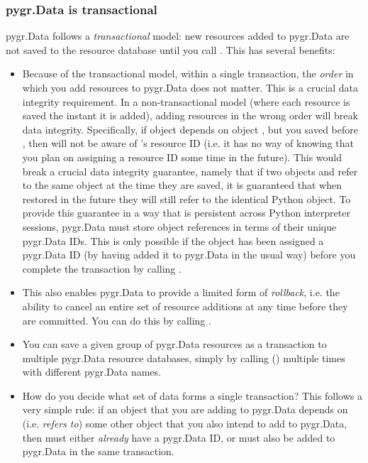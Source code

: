 \documentclass{howto}
\begin{document}
\subsubsection{pygr.Data is transactional}

pygr.Data follows a {\em transactional} model: new resources
added to pygr.Data are not saved to the resource database until you
call .  This has several benefits:

\begin{itemize}
\item Because of the transactional model,
within a single transaction, the {\em order} in which you
add resources to pygr.Data does not matter.  This is a crucial data
integrity requirement.  In a non-transactional model (where each
resource is saved the instant it is added), adding resources in the
wrong order will break data integrity.  Specifically, 
if object  depends on object , 
but you saved  before , then
 will not be aware of 's resource ID (i.e. it has no way of
knowing that you plan on assigning  a resource ID some time
in the future).  This would break a crucial data integrity guarantee,
namely that if two objects  and  refer to the same
object  at the time they are saved, it is guaranteed that
when restored in the future they will still refer to the identical
Python object.  To provide this guarantee in a way that is
persistent across Python interpreter sessions, pygr.Data must 
store object references in terms of their unique pygr.Data IDs.
This is only possible if the object has been assigned a pygr.Data
ID (by having added it to pygr.Data in the usual way) before
you complete the transaction by calling .

\item This also enables pygr.Data to provide a limited form of
{\em rollback}, i.e. the ability to cancel an entire set of
resource additions at any time before they are committed.
You can do this by calling .

\item You can save a given group of pygr.Data resources as a transaction
to multiple pygr.Data resource databases, simply by calling
() multiple times with different
pygr.Data  names.

\item How do you decide what set of data forms a single transaction?
This follows a very simple rule: if an object  that you are adding
to pygr.Data depends on (i.e. {\em refers
to}) some other object  that you also
intend to add to pygr.Data, then  must either {\em already} have a pygr.Data ID,
or  must also be added to pygr.Data in the same transaction.


\end{itemize}
\end{document}
